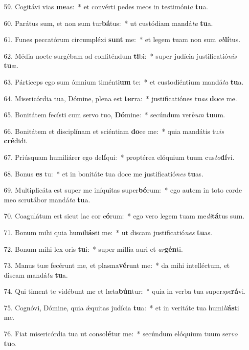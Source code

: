 59. Cogitávi vias \textbf{me}as:~*  et convérti pedes meos in testimóni\textit{a} \textbf{tu}a.\

60. Parátus sum, et non sum tur\textbf{bá}tus:~*  ut custódiam mandá\textit{ta} \textbf{tu}a.\

61. Funes peccatórum circumpléxi \textbf{sunt} me:~*  et legem tuam non sum \textit{ob}\textbf{lí}tus.\

62. Média nocte surgébam ad confiténdum \textbf{ti}bi:~*  super judícia justificatió\textit{nis} \textbf{tu}æ.\

63. Párticeps ego sum ómnium timénti\textbf{um} te:~*  et custodiéntium mandá\textit{ta} \textbf{tu}a.\

64. Misericórdia tua, Dómine, plena est \textbf{ter}ra:~*  justificatiónes tu\textit{as} \textbf{do}ce me.\

65. Bonitátem fecísti cum servo tuo, \textbf{Dó}mine:~*  secúndum ver\textit{bum} \textbf{tu}um.\

66. Bonitátem et disciplínam et sciéntiam \textbf{do}ce me:~*  quia mandátis tu\textit{is} \textbf{cré}didi.\

67. Priúsquam humiliárer ego de\textbf{lí}qui:~*  proptérea elóquium tuum cus\textit{to}\textbf{dí}vi.\

68. Bonus \textbf{es} tu:~*  et in bonitáte tua doce me justificatió\textit{nes} \textbf{tu}as.\

69. Multiplicáta est super me iníquitas super\textbf{bó}rum:~*  ego autem in toto corde meo scrutábor mandá\textit{ta} \textbf{tu}a.\

70. Coagulátum est sicut lac cor e\textbf{ó}rum:~*  ego vero legem tuam me\textit{di}\textbf{tá}tus sum.\

71. Bonum mihi quia humili\textbf{ás}ti me:~*  ut discam justificatió\textit{nes} \textbf{tu}as.\

72. Bonum mihi lex oris \textbf{tu}i:~*  super míllia auri et \textit{ar}\textbf{gén}ti.\

73. Manus tuæ fecérunt me, et plasma\textbf{vé}runt me:~*  da mihi intelléctum, et discam mandá\textit{ta} \textbf{tu}a.\

74. Qui timent te vidébunt me et læta\textbf{bún}tur:~*  quia in verba tua super\textit{spe}\textbf{rá}vi.\

75. Cognóvi, Dómine, quia ǽquitas judícia \textbf{tu}a:~*  et in veritáte tua humi\textit{li}\textbf{ás}ti me.\

76. Fiat misericórdia tua ut conso\textbf{lé}tur me:~*  secúndum elóquium tuum ser\textit{vo} \textbf{tu}o.\

